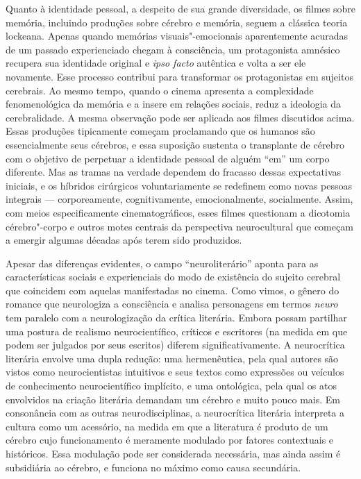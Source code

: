 Quanto à identidade pessoal, a despeito de sua grande diversidade, os
filmes sobre memória, incluindo produções sobre cérebro e memória,
seguem a clássica teoria lockeana. Apenas quando memórias
visuais"-emocionais aparentemente acuradas de um passado experienciado
chegam à consciência, um protagonista amnésico recupera sua identidade
original e \emph{ipso facto} autêntica e volta a ser ele novamente. Esse
processo contribui para transformar os protagonistas em sujeitos
cerebrais. Ao mesmo tempo, quando o cinema apresenta a complexidade
fenomenológica da memória e a insere em relações sociais, reduz a
ideologia da cerebralidade. A mesma observação pode ser aplicada aos
filmes discutidos acima. Essas produções tipicamente começam proclamando
que os humanos são essencialmente seus cérebros, e essa suposição
sustenta o transplante de cérebro com o objetivo de perpetuar a
identidade pessoal de alguém ``em'' um corpo diferente. Mas as tramas na
verdade dependem do fracasso dessas expectativas iniciais, e os híbridos
cirúrgicos voluntariamente se redefinem como novas pessoas integrais ---
corporeamente, cognitivamente, emocionalmente, socialmente. Assim, com
meios especificamente cinematográficos, esses filmes questionam a
dicotomia cérebro"-corpo e outros motes centrais da perspectiva
neurocultural que começam a emergir algumas décadas após terem sido
produzidos.

Apesar das diferenças evidentes, o campo ``neuroliterário'' aponta para
as características sociais e experienciais do modo de existência do
sujeito cerebral que coincidem com aquelas manifestadas no cinema. Como
vimos, o gênero do romance que neurologiza a consciência e analisa
personagens em termos \emph{neuro} tem paralelo com a neurologização da
crítica literária. Embora possam partilhar uma postura de realismo
neurocientífico, críticos e escritores (na medida em que podem ser
julgados por seus escritos) diferem significativamente. A neurocrítica
literária envolve uma dupla redução: uma hermenêutica, pela qual autores
são vistos como neurocientistas intuitivos e seus textos como expressões
ou veículos de conhecimento neurocientífico implícito, e uma ontológica,
pela qual os atos envolvidos na criação literária demandam um cérebro e
muito pouco mais. Em consonância com as outras neurodisciplinas, a
neurocrítica literária interpreta a cultura como um acessório, na medida
em que a literatura é produto de um cérebro cujo funcionamento é
meramente modulado por fatores contextuais e históricos. Essa modulação
pode ser considerada necessária, mas ainda assim é subsidiária ao
cérebro, e funciona no máximo como causa secundária.

